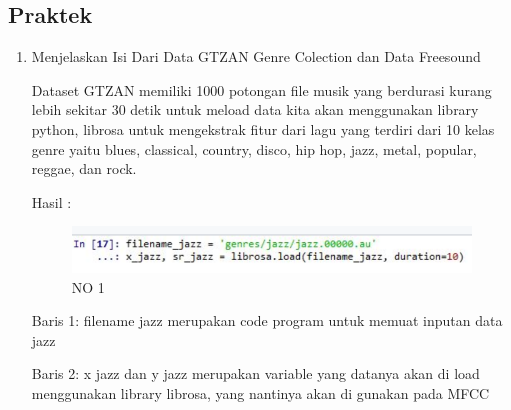 \subsection{Praktek}
\begin{enumerate}
\item Menjelaskan Isi Dari Data GTZAN Genre Colection dan Data Freesound
\begin{itemize}
\par Dataset GTZAN memiliki 1000 potongan file musik yang berdurasi kurang lebih sekitar 30 detik untuk meload data kita akan menggunakan library python, librosa untuk mengekstrak fitur dari lagu yang terdiri dari 10 kelas genre yaitu blues, classical, country, disco, hip hop, jazz, metal, popular, reggae, dan rock.
\par Hasil :
\begin{figure}[!hbtp]
\centering
\includegraphics[scale=0.7]{figures/andi/satu.PNG}
\caption{NO 1}
\label{Contoh Gambar 1}
\end{figure}
\par Baris 1: filename jazz merupakan code program untuk memuat inputan data jazz
\par Baris 2: x jazz dan y jazz merupakan variable yang datanya akan di load menggunakan
library librosa, yang nantinya akan di gunakan pada MFCC
\end{itemize}
\par


\end{enumerate}
